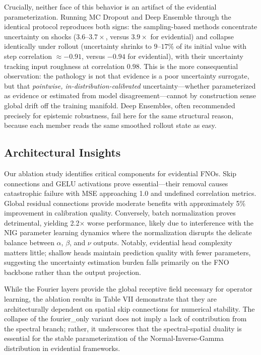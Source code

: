 Crucially, neither face of this behavior is an artifact of the evidential parameterization. Running MC Dropout and
Deep Ensemble through the identical protocol reproduces both signs: the sampling-based methods concentrate
uncertainty on shocks ($3.6$--$3.7\times$, versus $3.9\times$ for evidential) and collapse identically under
rollout (uncertainty shrinks to $9$--$17\%$ of its initial value with step correlation $\approx -0.91$, versus
$-0.94$ for evidential), with their uncertainty tracking input roughness at correlation $0.98$. This is the more
consequential observation: the pathology is not that evidence is a poor uncertainty surrogate, but that
\emph{pointwise, in-distribution-calibrated} uncertainty---whether parameterized as evidence or estimated from
model disagreement---cannot by construction sense global drift off the training manifold. Deep Ensembles, often
recommended precisely for epistemic robustness, fail here for the same structural reason, because each member
reads the same smoothed rollout state as easy.

\subsection{Architectural Insights}

Our ablation study identifies critical components for evidential FNOs. Skip connections
\cite{he2016deep} and GELU activations \cite{hendrycks2016gaussian} prove essential---their removal causes
catastrophic failure with MSE approaching 1.0 and undefined correlation metrics. 
Global residual connections provide moderate benefits with approximately 5\% improvement in calibration quality. 
Conversely, batch normalization \cite{ioffe2015batch} proves detrimental, yielding 2.2$\times$ worse performance,
likely due to interference with the NIG parameter learning dynamics where the normalization disrupts the delicate balance 
between $\alpha$, $\beta$, and $\nu$ outputs. Notably, evidential head complexity matters little; shallow heads 
maintain prediction quality with fewer parameters, suggesting the uncertainty estimation burden falls primarily on 
the FNO backbone rather than the output projection.

While the Fourier layers provide the global receptive field necessary for operator learning, the ablation results 
in Table VII demonstrate that they are architecturally dependent on spatial skip connections for numerical 
stability. The collapse of the fourier\_only variant does not imply a lack of contribution from the 
spectral branch; rather, it underscores that the spectral-spatial duality is essential for the stable 
parameterization of the Normal-Inverse-Gamma distribution in evidential frameworks.

